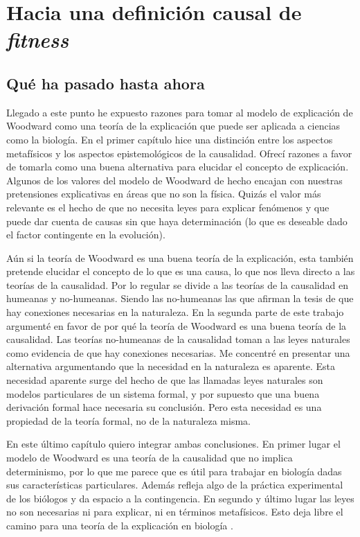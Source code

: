 \chapter{Hacia una definición causal de \emph{fitness}}

\section{Qué ha pasado hasta ahora}

\noindent Llegado a este punto he expuesto razones para tomar al modelo de explicación de Woodward como una teoría de la explicación que puede ser aplicada a ciencias como la biología. En el primer capítulo hice una distinción entre los aspectos metafísicos y los aspectos epistemológicos de la causalidad. Ofrecí razones a  favor de tomarla como una buena alternativa para elucidar el concepto de explicación. Algunos de los valores del modelo de Woodward de hecho encajan con nuestras pretensiones explicativas en áreas que no son la física. Quizás el valor más relevante es el hecho de que no necesita leyes para explicar fenómenos y que puede dar cuenta de causas sin que haya determinación (lo que es deseable dado el factor contingente en la evolución).

Aún si la teoría de Woodward es una buena teoría de la explicación, esta también pretende elucidar el concepto de lo que es una causa, lo que nos lleva directo a las teorías de la causalidad. Por lo regular se divide a las teorías de la causalidad en humeanas y no-humeanas. Siendo las no-humeanas las que afirman la tesis de que hay conexiones necesarias en la naturaleza. En la segunda parte de este trabajo argumenté en favor de por qué la teoría de Woodward es una buena teoría de la causalidad. Las teorías no-humeanas de la causalidad toman a las leyes naturales como evidencia de que hay conexiones necesarias. Me concentré en presentar una alternativa argumentando que la necesidad en la naturaleza es aparente. Esta necesidad aparente surge del hecho de que las llamadas leyes naturales son modelos particulares de un sistema formal, y por supuesto que una buena derivación formal hace necesaria su conclusión. Pero esta necesidad es una propiedad de la teoría formal, no de la naturaleza misma.

En este último capítulo quiero integrar ambas conclusiones. En primer lugar el modelo de Woodward es una teoría de la causalidad que no implica determinismo, por lo que me parece que es útil para trabajar en biología dadas sus características particulares. Además refleja algo de la práctica experimental de los biólogos y da espacio a la contingencia. En segundo y último lugar las leyes no son necesarias ni para explicar, ni en términos metafísicos. Esto deja libre el camino para una teoría de la explicación en biología \cite{Brandon1997}.


